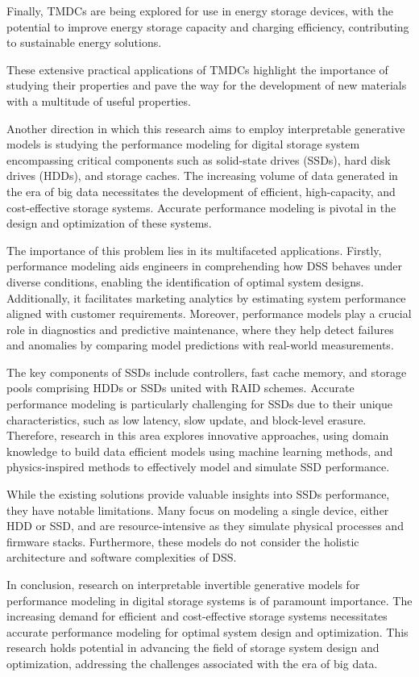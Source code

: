Finally, TMDCs are being explored for use in energy storage devices, with the potential to improve energy storage capacity and charging efficiency, contributing to sustainable energy solutions. 

These extensive practical applications of TMDCs highlight the importance of studying their properties and pave the way for the development of new materials with a multitude of useful properties.

Another direction in which this research aims to employ interpretable generative models is 
studying the performance modeling for digital storage system encompassing critical components such as solid-state drives (SSDs), hard disk drives (HDDs), and storage caches. The increasing volume of data generated in the era of big data necessitates the development of efficient, high-capacity, and cost-effective storage systems. Accurate performance modeling is pivotal in the design and optimization of these systems.

The importance of this problem lies in its multifaceted applications. Firstly, performance modeling aids engineers in comprehending how DSS behaves under diverse conditions, enabling the identification of optimal system designs. Additionally, it facilitates marketing analytics by estimating system performance aligned with customer requirements. Moreover, performance models play a crucial role in diagnostics and predictive maintenance, where they help detect failures and anomalies by comparing model predictions with real-world measurements.

The key components of SSDs include controllers, fast cache memory, and storage pools comprising HDDs or SSDs united with RAID schemes. Accurate performance modeling is particularly challenging for SSDs due to their unique characteristics, such as low latency, slow update, and block-level erasure. Therefore, research in this area explores innovative approaches, using domain knowledge to build data efficient models using machine learning methods, and physics-inspired methods to effectively model and simulate SSD performance.

While the existing solutions provide valuable insights into SSDs performance, they have notable limitations. Many focus on modeling a single device, either HDD or SSD, and are resource-intensive as they simulate physical processes and firmware stacks. Furthermore, these models do not consider the holistic architecture and software complexities of DSS.

In conclusion, research on interpretable invertible generative models for performance modeling in digital storage systems is of paramount importance. The increasing demand for efficient and cost-effective storage systems necessitates accurate performance modeling for optimal system design and optimization. This research holds potential in advancing the field of storage system design and optimization, addressing the challenges associated with the era of big data.



